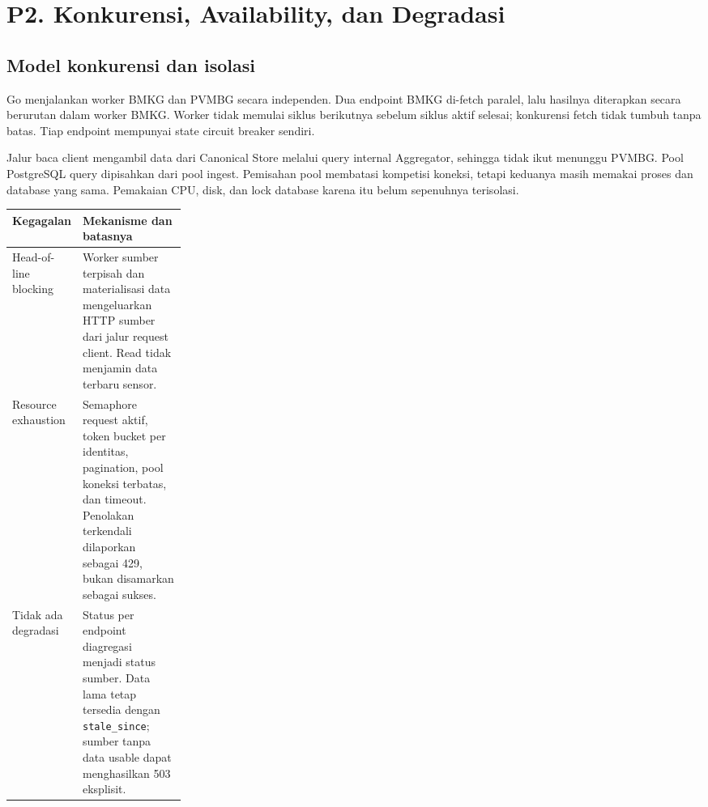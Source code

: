 \section{P2. Konkurensi, Availability, dan Degradasi}
\label{sec:p2}
\subsection{Model konkurensi dan isolasi}
Go menjalankan worker BMKG dan PVMBG secara independen. Dua endpoint BMKG di-fetch paralel, lalu hasilnya diterapkan secara berurutan dalam worker BMKG. Worker tidak memulai siklus berikutnya sebelum siklus aktif selesai; konkurensi fetch tidak tumbuh tanpa batas. Tiap endpoint mempunyai state circuit breaker sendiri.

Jalur baca client mengambil data dari Canonical Store melalui query internal Aggregator, sehingga tidak ikut menunggu PVMBG. Pool PostgreSQL query dipisahkan dari pool ingest. Pemisahan pool membatasi kompetisi koneksi, tetapi keduanya masih memakai proses dan database yang sama. Pemakaian CPU, disk, dan lock database karena itu belum sepenuhnya terisolasi.

\begin{tabularx}{\linewidth}{P{0.25\linewidth}Y}
\toprule Kegagalan & Mekanisme dan batasnya\\\midrule
Head-of-line blocking & Worker sumber terpisah dan materialisasi data mengeluarkan HTTP sumber dari jalur request client. Read tidak menjamin data terbaru sensor.\\
Resource exhaustion & Semaphore request aktif, token bucket per identitas, pagination, pool koneksi terbatas, dan timeout. Penolakan terkendali dilaporkan sebagai 429, bukan disamarkan sebagai sukses.\\
Tidak ada degradasi & Status per endpoint diagregasi menjadi status sumber. Data lama tetap tersedia dengan \texttt{stale\_since}; sumber tanpa data usable dapat menghasilkan 503 eksplisit.\\
\bottomrule
\end{tabularx}

